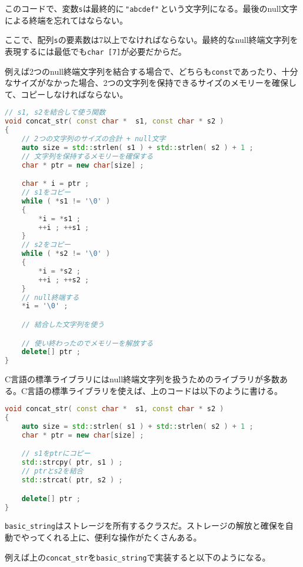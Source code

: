 このコードで、変数\texttt{s}は最終的に\,\texttt{"abcdef"}\,という文字列になる。最後のnull文字による終端を忘れてはならない。

ここで、配列\texttt{s}の要素数は7以上でなければならない。最終的なnull終端文字列を表現するには最低でも\texttt{char [7]}が必要だからだ。

例えば2つのnull終端文字列を結合する場合で、どちらも\texttt{const}であったり、十分なサイズがなかった場合、2つの文字列を保持できるサイズのメモリーを確保して、コピーしなければならない。

\begin{lstlisting}[language={C++}]
// s1, s2を結合して使う関数
void concat_str( const char *  s1, const char * s2 )
{
    // 2つの文字列のサイズの合計 + null文字
    auto size = std::strlen( s1 ) + std::strlen( s2 ) + 1 ;
    // 文字列を保持するメモリーを確保する
    char * ptr = new char[size] ;

    char * i = ptr ;
    // s1をコピー
    while ( *s1 != '\0' )
    {
        *i = *s1 ;
        ++i ; ++s1 ;
    }
    // s2をコピー
    while ( *s2 != '\0' )
    {
        *i = *s2 ;
        ++i ; ++s2 ;
    }
    // null終端する
    *i = '\0' ;

    // 結合した文字列を使う

    // 使い終わったのでメモリーを解放する
    delete[] ptr ;
}
\end{lstlisting}

C言語の標準ライブラリにはnull終端文字列を扱うためのライブラリが多数ある。C言語の標準ライブラリを使えば、上のコードは以下のように書ける。

\begin{lstlisting}[language={C++}]
void concat_str( const char *  s1, const char * s2 )
{
    auto size = std::strlen( s1 ) + std::strlen( s2 ) + 1 ;
    char * ptr = new char[size] ;

    // s1をptrにコピー
    std::strcpy( ptr, s1 ) ;
    // ptrとs2を結合
    std::strcat( ptr, s2 ) ;

    delete[] ptr ;
}
\end{lstlisting}


\texttt{basic\_string}はストレージを所有するクラスだ。ストレージの解放と確保を自動でやってくれる上に、便利な操作がたくさんある。

\ifTombow\pagebreak\fi
例えば上の\texttt{concat\_str}を\texttt{basic\_string}で実装すると以下のようになる。

